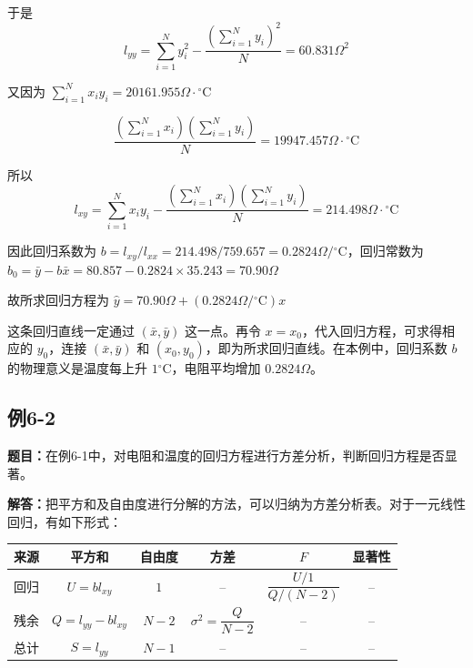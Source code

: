 \documentclass[UTF8,zihao=-4]{ctexart}
\newcommand{\problem}[1]{\subsection*{#1}}
\newcommand{\timu}{\noindent\textbf{题目：}}
\newcommand{\jieda}{\noindent\textbf{解答：}}
\begin{document}
于是
\begin{equation*}
    l_{yy} = \sum_{i=1}^{N}y_i^2 - \frac{\left(\displaystyle\sum_{i=1}^{N}y_i\right)^2}{N} = 60.831\Omega^2
\end{equation*}

又因为 $\sum_{i=1}^{N}x_i y_i=20161.955\Omega\cdot{}^\circ\mathrm{C}$

\begin{equation*}
    \frac{\left(\displaystyle\sum_{i=1}^{N}x_i\right) \left(\displaystyle\sum_{i=1}^{N}y_i\right)}{N} = 19947.457\Omega\cdot{}^\circ\mathrm{C}
\end{equation*}

所以
\begin{equation*}
    l_{xy} = \sum_{i=1}^{N}x_i y_i - \frac{\left(\displaystyle\sum_{i=1}^{N}x_i\right) \left(\displaystyle\sum_{i=1}^{N}y_i\right)}{N} = 214.498\Omega\cdot{}^\circ\mathrm{C}
\end{equation*}

因此回归系数为 $b=l_{xy}/l_{xx}=214.498/759.657=0.2824\Omega/{}^\circ\mathrm{C}$，回归常数为 $b_0=\bar{y}-b\bar{x}=80.857-0.2824\times35.243=70.90\Omega$

故所求回归方程为 $\hat{y} = 70.90\Omega + (0.2824\Omega/{}^\circ\mathrm{C})x$

这条回归直线一定通过 $(\bar{x},\bar{y})$ 这一点。再令 $x=x_0$，代入回归方程，可求得相应的 $y_0$，连接 $(\bar{x},\bar{y})$ 和 $(x_0,y_0)$，即为所求回归直线。在本例中，回归系数 $b$ 的物理意义是温度每上升 $1{}^\circ\mathrm{C}$，电阻平均增加 $0.2824\Omega$。

\problem{例6-2}

\timu 在例6-1中，对电阻和温度的回归方程进行方差分析，判断回归方程是否显著。

\jieda 把平方和及自由度进行分解的方法，可以归纳为方差分析表。对于一元线性回归，有如下形式：

\begin{center}
\small
\setlength{\tabcolsep}{5pt}
\begin{tabular}{c|c|c|c|c|c}
\toprule
来源 & 平方和 & 自由度 & 方差 & $F$ & 显著性\\
\midrule
回归 & $U=bl_{xy}$ & $1$ & -- & $\dfrac{U/1}{Q/(N-2)}$ & --\\
残余 & $Q=l_{yy}-bl_{xy}$ & $N-2$ & $\sigma^2=\dfrac{Q}{N-2}$ & -- & --\\
总计 & $S=l_{yy}$ & $N-1$ & -- & -- & --\\
\bottomrule
\end{tabular}
\end{center}
\end{document}
